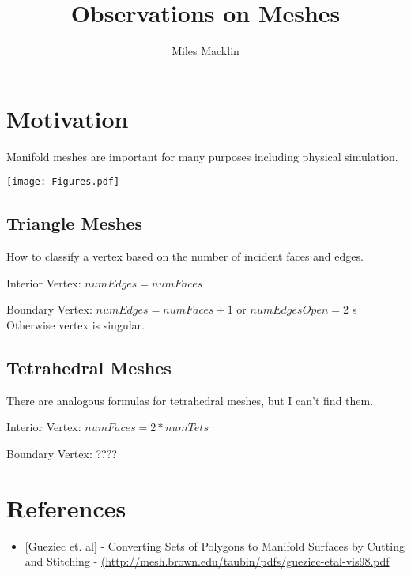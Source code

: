\documentclass[11pt]{article}
\title{Observations on Meshes}
\author{Miles Macklin}
\begin{document}
\maketitle

\section{Motivation}

Manifold meshes are important for many purposes including physical simulation. 

\texttt{[image: Figures.pdf]} 

\subsection{Triangle Meshes}

How to classify a vertex based on the number of incident faces and edges.

Interior Vertex: $numEdges = numFaces$

Boundary Vertex: $numEdges = numFaces+1$ or $numEdgesOpen = 2$
s
Otherwise vertex is singular.

\subsection{Tetrahedral Meshes}

There are analogous formulas for tetrahedral meshes, but I can't find them.

Interior Vertex: $numFaces = 2*numTets$

Boundary Vertex: ????

\section {References}

\begin{itemize}
\item{[Gueziec et. al] - Converting Sets of Polygons to Manifold Surfaces by Cutting and Stitching - \url{(http://mesh.brown.edu/taubin/pdfs/gueziec-etal-vis98.pdf}}
\end{itemize}
\end{document}
